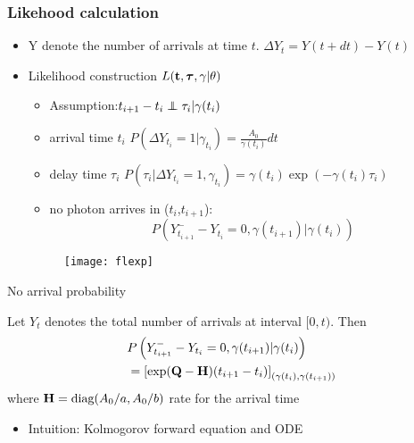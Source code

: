 \documentclass[11pt]{beamer}
\newcommand{\bit}{\begin{itemize}\setlength{\itemsep}{0cm}\setlength{\topsep}{0cm}}
\newcommand{\eit}{\end{itemize}}
\newcommand{\bQ}{{\bf Q}}
\newcommand{\bH}{{\bf H}}
\newcommand{\bD}{{\bf D}}
\newcommand{\btheta}{{\boldsymbol{\theta}}}
\newcommand{\btau}{{\boldsymbol{\tau}}}
\newcommand{\bt}{{\bf t}}
\newcommand\independent{\protect\mathpalette{\protect\independenT}{\perp}}
\def\independenT#1#2{\mathrel{\rlap{$#1#2$}\mkern2mu{#1#2}}}
\begin{document}
\begin{frame}
\frametitle{Likehood calculation}

\bit
\item Y denote the number of arrivals at time $t$. $\Delta Y_t=Y(t+dt)-Y(t)$ 
\item Likelihood construction $L(\bt,\btau,\gamma|\theta)$
\bit
\item Assumption:\quad $t_{i+1}-t_i \independent \tau_i | \gamma(t_i)$
\item arrival time $t_i$ \qquad $P(\Delta Y_{t_i}=1|\gamma_{t_i})=\frac{A_0}{\gamma(t_i)}dt$
\item delay time $\tau_i$ \qquad  $P(\tau_i|\Delta Y_{t_i}=1,\gamma_{t_i})=\gamma(t_i)\exp(-\gamma(t_i)\tau_i)$
\item no photon arrives in ($t_i$,$t_{i+1}$):  $$P\left(Y^-_{t_{i+1}}-Y_{t_i}=0, \gamma(t_{i+1})|\gamma(t_i)\right)$$
\eit
\begin{figure}
	\centering
	\texttt{[image: flexp]}
\end{figure}




\eit
\end{frame}
\begin{frame}
\begin{block}{No arrival probability}
\begin{theorem}
	Let $Y_t$ denotes the total number of arrivals at interval $[0,t)$. Then 
	\begin{align*}
	&P\left(Y^-_{t_{i+1}}-Y_{t_i}=0, \gamma(t_{i+1})|\gamma(t_i)\right)\\
	&=\left[\exp(\bQ-\bH)(t_{i+1}-t_i)\right]_{(\gamma(t_i),\gamma(t_{i+1}))}
	\end{align*}
	where $\bH=\mbox{diag}(A_0/a,A_0/b)$ rate for the arrival time\\
\end{theorem}
\end{block}
\bit
\item Intuition: Kolmogorov forward equation and ODE
\eit
\end{frame}
\end{document}
